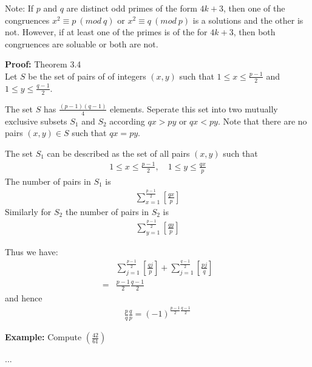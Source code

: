 \documentclass[a4paper]{article}
\begin{document}
Note: If $p$ and $q$ are distinct odd primes of the form $4k+3$, then one of the congruences $x^2\equiv p\ (mod\ q)$ or $x^2\equiv q\ (mod\ p)$ is a solutions and the other is not. However, if at least one of the primes is of the for $4k+3$, then both congruences are soluable or both are not.

\textbf{Proof:} Theorem 3.4\\
Let $S$ be the set of pairs of of integers $(x,y)$ such that $1\leq x\leq\frac{p-1}{2}$ and $1\leq y\leq\frac{q-1}{2}$.

The set $S$ has $\frac{(p-1)(q-1)}{4}$ elements. Seperate this set into two mutually exclusive subsets $S_1$ and $S_2$ according $qx>py$ or $qx<py$. Note that there are no pairs $(x,y)\in S$ such that $qx=py$.

The set $S_1$ can be described as the set of all pairs $(x,y)$ such that
\begin{align}
    1\leq x\leq\frac{p-1}{2},\quad 1\leq y\leq\frac{qx}{p}
\end{align}
The number of pairs in $S_1$ is
\begin{align}
    \sum^\frac{p-1}{2}_{x=1}[\frac{qx}{p}]
\end{align}
Similarly for $S_2$ the number of pairs in $S_2$ is
\begin{align}
    \sum^\frac{p-1}{2}_{y=1}[\frac{qy}{p}]
\end{align}

Thus we have:
\begin{align}
     &\sum^{\frac{p-1}{2}}_{j=1}[\frac{qj}{p}]+\sum^{\frac{q-1}{2}}_{j=1}[\frac{pj}{q}]\\
    =&\frac{p-1}{2}\frac{q-1}{2}
\end{align}
and hence
\begin{align}
    \frac{p}{q}\frac{q}{p}=(-1)^{\frac{p-1}{2}\frac{q-1}{2}}
\end{align}

\textbf{Example:} Compute $(\frac{42}{61})$

...
\end{document}
